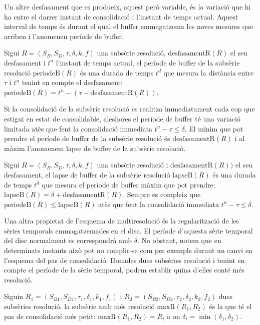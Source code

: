 Un altre desfasament que es produeix, aquest però variable, és la
variació que hi ha entre el darrer instant de consolidació i l'instant
de temps actual. Aquest interval de temps és durant el qual el buffer
emmagatzema les noves mesures que arriben i l'anomenen període de
buffer.
\begin{definition}
  Sigui $R=(S_B,S_D,\tau,\delta,k,f)$ una subsèrie resolució,
  $\text{desfasamentR}(R)$ el seu desfasament i $t^n$ l'instant de
  temps actual, el període de buffer de la subsèrie resolució
  $\text{periodeB}(R)$ és una durada de temps $t^d$ que mesura la
  distància entre $\tau$ i $t^n$ tenint en compte el desfasament:
  $\text{periodeB}(R) = t^n - (\tau - \text{desfasamentR}(R))$.
\end{definition}

Si la consolidació de la subsèrie resolució es realitza immediatament
cada cop que estigui en estat de consolidable, aleshores el període de
buffer té una variació limitada atès que fent la consolidació
immediata $t^n - \tau \leq \delta$. El mínim que pot prendre el
període de buffer de la subsèrie resolució és $\text{desfasamentR}(R)$
i al màxim l'anomenem lapse de buffer de la subsèrie resolució.
\begin{definition}
  Sigui $R=(S_B,S_D,\tau,\delta,k,f)$ una subsèrie resolució i
  $\text{desfasamentR}(R))$ el seu desfasament, el lapse de buffer de
  la subsèrie resolució $\text{lapseB}(R)$ és una durada de temps
  $t^d$ que mesura el període de buffer màxim que pot prendre:
  $\text{lapseB}(R) = \delta + \text{desfasamentR}(R)$.  Sempre es
  compleix que $\text{periodeB}(R) \leq \text{lapseB}(R)$ atès que
  fent la consolidació immediata $t^n - \tau \leq \delta$.
\end{definition}


Una altra propietat de l'esquema de multiresolució és la
regularització de les sèries temporals emmagatzemades en el disc. El
període d'aquesta sèrie temporal del disc normalment es correspondrà
amb $\delta$. No obstant, notem que en determinats instants això pot
no complir-se com per exemple durant un canvi en l'esquema del pas de
consolidació. Donades dues subsèries resolució i tenint en compte el
període de la sèrie temporal, podem establir quina d'elles conté més
resolució.
\begin{definition}
  Siguin $R_1=(S_{B1},S_{D1},\tau_1,\delta_1,k_1,f_1)$ i
  $R_2=(S_{B2},S_{D2},\tau_2,\delta_2,k_2,f_2)$ dues subsèries
  resolució, la subsèrie amb més resolució $\text{maxR}(R_1,R_2)$ és
  la que té el pas de consolidació més petit: $\text{maxR}(R_1,R_2) =
  R_i$ a on $\delta_i = \min(\delta_1,\delta_2)$.
\end{definition}



